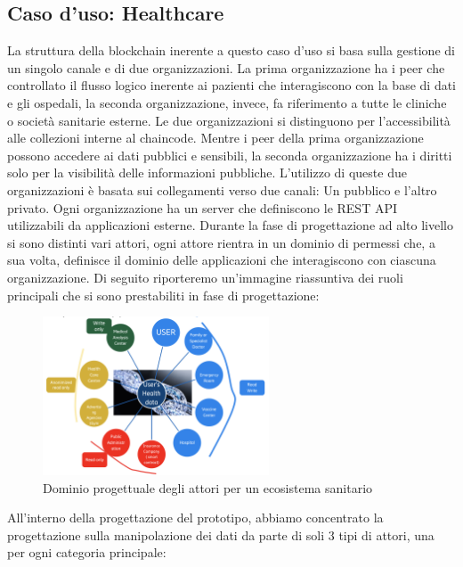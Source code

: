 \subsection{Caso d'uso: Healthcare}
La struttura della blockchain inerente a questo caso d'uso si basa sulla gestione di un singolo canale e di due organizzazioni. La prima organizzazione ha i peer che controllato il flusso logico inerente ai pazienti che interagiscono con la base di dati e gli ospedali, la seconda organizzazione, invece, fa riferimento a tutte le cliniche o società sanitarie esterne. Le due organizzazioni si distinguono per l'accessibilità alle collezioni interne al chaincode. Mentre i peer della prima organizzazione possono accedere ai dati pubblici e sensibili, la seconda organizzazione ha i diritti solo per la visibilità delle informazioni pubbliche. 
L'utilizzo di queste due organizzazioni è basata sui collegamenti verso due canali: Un pubblico e l'altro privato. Ogni organizzazione ha un server che definiscono le REST API utilizzabili da applicazioni esterne. Durante la fase di progettazione ad alto livello si sono distinti vari attori, ogni attore rientra in un dominio di permessi che, a sua volta, definisce il dominio delle applicazioni che interagiscono con ciascuna organizzazione. Di seguito riporteremo un'immagine riassuntiva dei ruoli principali che si sono prestabiliti in fase di progettazione: 
\begin{figure}[h]
    \centering
    \includegraphics[width=0.6\textwidth]{img/actors-healthcare.png}
    \caption{Dominio progettuale degli attori per un ecosistema sanitario}
    \label{fig:actors-healthcare}
\end{figure}
All'interno della progettazione del prototipo, abbiamo concentrato la progettazione sulla manipolazione dei dati da parte di soli 3 tipi di attori, una per ogni categoria principale:
